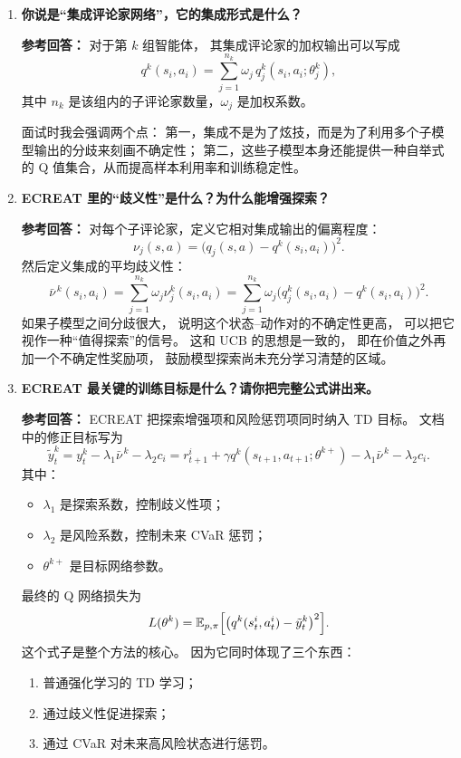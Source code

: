 \documentclass[11pt,a4paper]{ctexart}
\begin{document}
\begin{enumerate}[leftmargin=*, label=\textbf{Q\arabic*.}]
\item \textbf{你说是“集成评论家网络”，它的集成形式是什么？}

\textbf{参考回答：}
对于第 $k$ 组智能体，
其集成评论家的加权输出可以写成
\[
q^k(s_i,a_i)
=
\sum_{j=1}^{n_k}\omega_j\, q_j^k(s_i,a_i;\theta_j^k),
\]
其中 $n_k$ 是该组内的子评论家数量，$\omega_j$ 是加权系数。

面试时我会强调两个点：
第一，集成不是为了炫技，而是为了利用多个子模型输出的分歧来刻画不确定性；
第二，这些子模型本身还能提供一种自举式的 Q 值集合，从而提高样本利用率和训练稳定性。

\item \textbf{ECREAT 里的“歧义性”是什么？为什么能增强探索？}

\textbf{参考回答：}
对每个子评论家，定义它相对集成输出的偏离程度：
\[
\nu_j(s,a)
=
\bigl(q_j(s,a)-q^k(s_i,a_i)\bigr)^2.
\]
然后定义集成的平均歧义性：
\[
\bar{\nu}^{\,k}(s_i,a_i)
=
\sum_{j=1}^{n_k}\omega_j \nu_j^k(s_i,a_i)
=
\sum_{j=1}^{n_k}
\omega_j
\bigl(q_j^k(s_i,a_i)-q^k(s_i,a_i)\bigr)^2.
\]
如果子模型之间分歧很大，
说明这个状态--动作对的不确定性更高，
可以把它视作一种“值得探索”的信号。
这和 UCB 的思想是一致的，
即在价值之外再加一个不确定性奖励项，
鼓励模型探索尚未充分学习清楚的区域。

\item \textbf{ECREAT 最关键的训练目标是什么？请你把完整公式讲出来。}

\textbf{参考回答：}
ECREAT 把探索增强项和风险惩罚项同时纳入 TD 目标。
文档中的修正目标写为
\[
\tilde y_t^k
=
y_t^k - \lambda_1 \bar{\nu}^{\,k} - \lambda_2 c_i
=
r_{t+1}^i
+
\gamma q^k(s_{t+1},a_{t+1};\theta^{k+})
-
\lambda_1 \bar{\nu}^{\,k}
-
\lambda_2 c_i.
\]
其中：
\begin{itemize}
\item $\lambda_1$ 是探索系数，控制歧义性项；
\item $\lambda_2$ 是风险系数，控制未来 CVaR 惩罚；
\item $\theta^{k+}$ 是目标网络参数。
\end{itemize}

最终的 Q 网络损失为
\[
L(\theta^k)
=
\mathbb{E}_{p,\pi}
\Bigl[
\bigl(q^k(s_t^i,a_t^i)-\tilde y_t^k\bigr)^2
\Bigr].
\]
这个式子是整个方法的核心。
因为它同时体现了三个东西：
\begin{enumerate}
\item 普通强化学习的 TD 学习；
\item 通过歧义性促进探索；
\item 通过 CVaR 对未来高风险状态进行惩罚。
\end{enumerate}


\end{enumerate}
\end{document}
